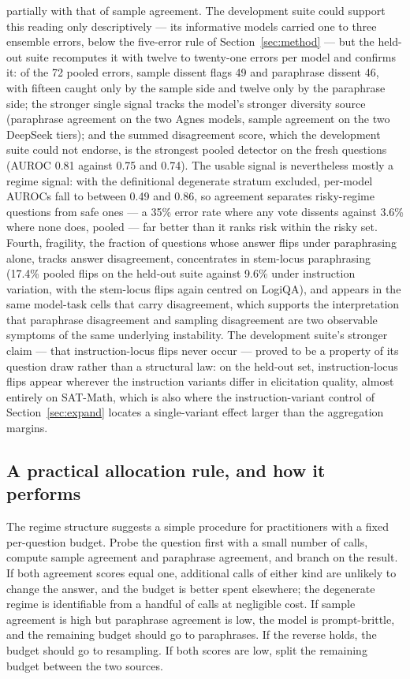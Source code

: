 partially with that of sample agreement. The development suite could support this reading only descriptively --- its informative models carried one to three ensemble errors, below the five-error rule of Section~\ref{sec:method} --- but the held-out suite recomputes it with twelve to twenty-one errors per model and confirms it: of the 72 pooled errors, sample dissent flags 49 and paraphrase dissent 46, with fifteen caught only by the sample side and twelve only by the paraphrase side; the stronger single signal tracks the model's stronger diversity source (paraphrase agreement on the two Agnes models, sample agreement on the two DeepSeek tiers); and the summed disagreement score, which the development suite could not endorse, is the strongest pooled detector on the fresh questions (AUROC 0.81 against 0.75 and 0.74). The usable signal is nevertheless mostly a regime signal: with the definitional degenerate stratum excluded, per-model AUROCs fall to between 0.49 and 0.86, so agreement separates risky-regime questions from safe ones --- a 35\% error rate where any vote dissents against 3.6\% where none does, pooled --- far better than it ranks risk within the risky set. Fourth, fragility, the fraction of questions whose answer flips under paraphrasing alone, tracks answer disagreement, concentrates in stem-locus paraphrasing (17.4\% pooled flips on the held-out suite against 9.6\% under instruction variation, with the stem-locus flips again centred on LogiQA), and appears in the same model-task cells that carry disagreement, which supports the interpretation that paraphrase disagreement and sampling disagreement are two observable symptoms of the same underlying instability. The development suite's stronger claim --- that instruction-locus flips never occur --- proved to be a property of its question draw rather than a structural law: on the held-out set, instruction-locus flips appear wherever the instruction variants differ in elicitation quality, almost entirely on SAT-Math, which is also where the instruction-variant control of Section~\ref{sec:expand} locates a single-variant effect larger than the aggregation margins.

\subsection{A practical allocation rule, and how it performs}

The regime structure suggests a simple procedure for practitioners with a fixed per-question budget. Probe the question first with a small number of calls, compute sample agreement and paraphrase agreement, and branch on the result. If both agreement scores equal one, additional calls of either kind are unlikely to change the answer, and the budget is better spent elsewhere; the degenerate regime is identifiable from a handful of calls at negligible cost. If sample agreement is high but paraphrase agreement is low, the model is prompt-brittle, and the remaining budget should go to paraphrases. If the reverse holds, the budget should go to resampling. If both scores are low, split the remaining budget between the two sources.


